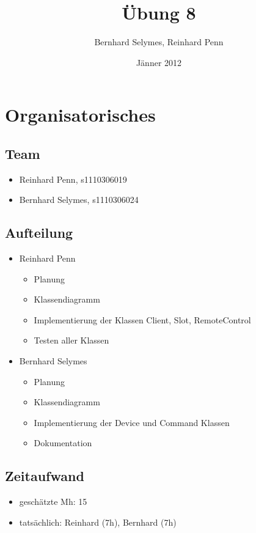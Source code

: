 \documentclass[12pt,a4paper]{article}
\begin{document}
\title{Übung 8}
\author{Bernhard Selymes, Reinhard Penn}
\date{Jänner 2012}

\normalsize

\newcommand{\CodePath}{../RemoteControl/RemoteControl/}

\section{Organisatorisches}

\subsection{Team}
	\begin {itemize} 
		\item Reinhard Penn, s1110306019 
		\item Bernhard Selymes, s1110306024
	\end {itemize}

\subsection{Aufteilung}
	\begin {itemize} 
		\item Reinhard Penn
			\begin {itemize}
				\item Planung
				\item Klassendiagramm
				\item Implementierung der Klassen Client, Slot, RemoteControl
				\item Testen aller Klassen
			\end {itemize}
		\item Bernhard Selymes
			\begin {itemize}
				\item Planung
				\item Klassendiagramm
				\item Implementierung der Device und Command Klassen
				\item Dokumentation		
			\end {itemize}
	\end {itemize}


\subsection{Zeitaufwand}
	\begin {itemize}
		\item geschätzte Mh: 15
		\item tatsächlich: Reinhard (7h), Bernhard  (7h)
	\end {itemize}
\end{document}

